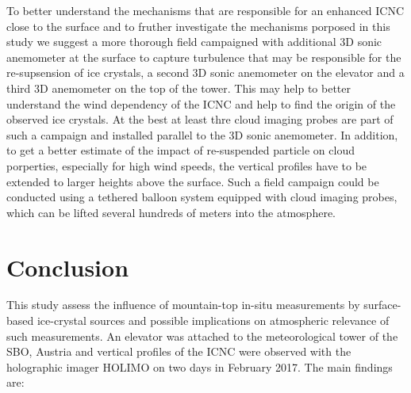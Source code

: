 \documentclass[draft,linenumbers]{agujournal}
\begin{document}
To better understand the mechanisms that are responsible for an enhanced ICNC close to the surface and to fruther investigate the mechanisms porposed in this study we suggest a more thorough field campaigned with additional 3D sonic anemometer at the surface to capture turbulence that may be responsible for the re-supsension of ice crystals, a second 3D sonic anemometer on the elevator and a third 3D anemometer on the top of the tower. This may help to better understand the wind dependency of the ICNC and help to find the origin of the observed ice crystals. At the best at least thre cloud imaging probes are part of such a campaign and installed parallel to the 3D sonic anemometer. In addition, to get a better estimate of the impact of re-suspended particle on cloud porperties, especially for high wind speeds, the vertical profiles have to be extended to larger heights above the surface. Such a field campaign could be conducted using a tethered balloon system equipped with cloud imaging probes, which can be lifted several hundreds of meters into the atmosphere.

\section{Conclusion}
This study assess the influence of mountain-top in-situ measurements by surface-based ice-crystal sources and possible implications on atmospheric relevance of such measurements. An elevator was attached to the meteorological tower of the SBO, Austria and vertical profiles of the ICNC were observed with the holographic imager HOLIMO on two days in February 2017. The main findings are:
\end{document}
